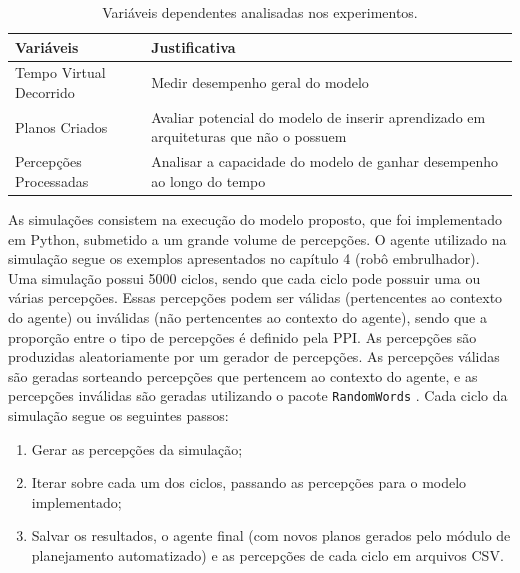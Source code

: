 \begin{table}[h!]
    \begin{center}
        \caption{ Variáveis dependentes analisadas nos experimentos. }
        \label{table:experiments_variables}
        \begin{tabularx}{\textwidth}{ |Y|Y| }
            \hline
            \textbf{Variáveis} & \textbf{Justificativa} \\
            \hline
            Tempo Virtual Decorrido & Medir desempenho geral do modelo \\
            \hline
            Planos Criados & Avaliar potencial do modelo de inserir aprendizado em arquiteturas que não o possuem \\
            \hline
            Percepções Processadas & Analisar a capacidade do modelo de ganhar desempenho ao longo do tempo\\
            \hline
        \end{tabularx}{}
    \end{center}{}
\end{table}

As simulações consistem na execução do modelo proposto, que foi implementado em Python, submetido a um grande volume de percepções. O agente utilizado na simulação segue os exemplos apresentados no capítulo 4 (robô embrulhador).
Uma simulação possui 5000 ciclos, sendo que cada ciclo pode possuir uma ou várias percepções. Essas percepções podem ser válidas (pertencentes ao contexto do agente) ou inválidas (não pertencentes ao contexto do agente), sendo que a proporção entre o tipo de percepções é definido pela PPI. As percepções são produzidas aleatoriamente por um gerador de percepções. As percepções válidas são geradas sorteando percepções que pertencem ao contexto do agente, e as percepções inválidas são geradas utilizando o pacote \texttt{RandomWords} \cite{pipRandomWords}. Cada ciclo da simulação segue os seguintes passos:

\begin{enumerate}
    \item Gerar as percepções da simulação;
    \item Iterar sobre cada um dos ciclos, passando as percepções para o modelo implementado;
    \item Salvar os resultados, o agente final (com novos planos gerados pelo módulo de planejamento automatizado) e as percepções de cada ciclo em arquivos CSV.
\end{enumerate}

